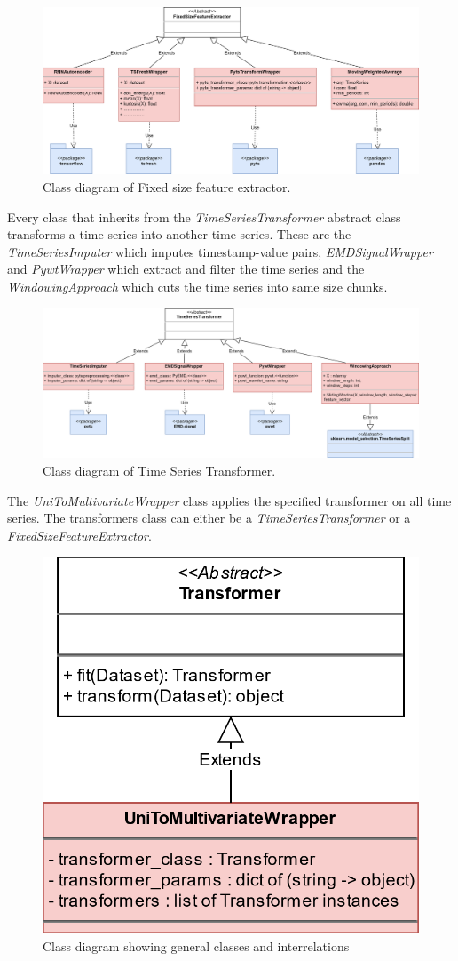 \begin{figure}[ht]
    \centering
    \includegraphics[width=\textwidth]{gfx/Interfaces-TFE-FixedSize.png}
    \caption{Class diagram of Fixed size feature extractor.}
    \label{fig:interfaces-tfe-fixedsize}
\end{figure}
Every class that inherits from the \textit{TimeSeriesTransformer} abstract class transforms a time series into another time series. These are the \textit{TimeSeriesImputer} which imputes timestamp-value pairs, \textit{EMDSignalWrapper} and \textit{PywtWrapper} which extract and filter the time series and the \textit{WindowingApproach} which cuts the time series into same size chunks.
\begin{figure}[ht]
    \centering
    \includegraphics[width=\textwidth]{gfx/Interfaces-TFE-Transformer.png}
    \caption{Class diagram of Time Series Transformer.}
    \label{fig:interfaces-tfe-transformer}
\end{figure}
The \textit{UniToMultivariateWrapper} class applies the specified transformer on all time series. The transformers class can either be a \textit{TimeSeriesTransformer} or a \textit{FixedSizeFeatureExtractor}.
\begin{figure}[ht]
    \centering
    \includegraphics[width=.4\textwidth]{gfx/uni_to_multivariate_wrapper_class}
    \caption{Class diagram showing general classes and interrelations}
    \label{fig:interfaces-tfe-unitomulti}
\end{figure}
\newpage
